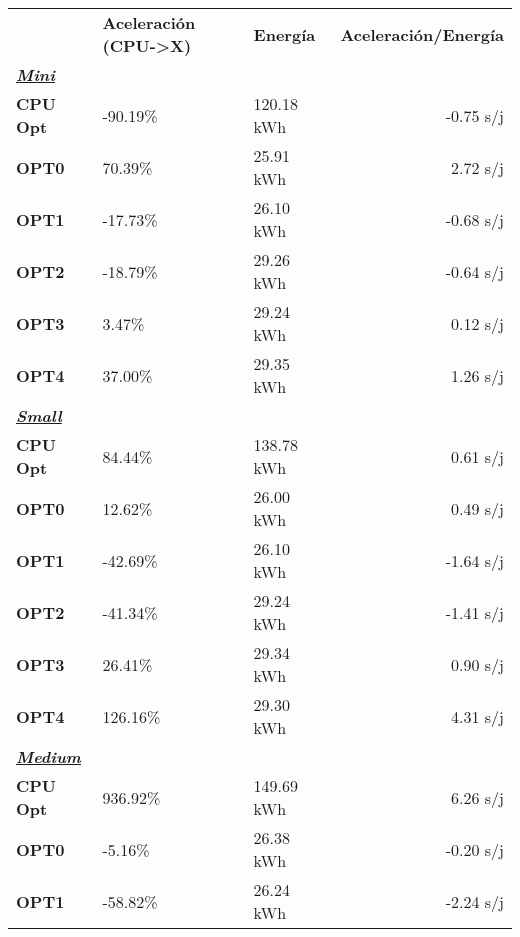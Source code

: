 \begin{table}[H]
    \centering
    \begin{tabular}{lllr}
    \rowcolor[HTML]{DAE8FC} \ & \textbf{Aceleración (CPU->X)} & \textbf{	Energía} & \textbf{	Aceleración/Energía} \\
    \cellcolor[HTML]{DAE8FC} \textbf{\textbf{{\emph{{\underline{{Mini}}}}}}} & &	&	 \\
    \rowcolor[HTML]{EFEFEF} \cellcolor[HTML]{DAE8FC} \textbf{CPU Opt} &-90.19\%  &	120.18 kWh  &	-0.75 s/j \\
    \cellcolor[HTML]{DAE8FC} \textbf{OPT0} & 70.39\%  &	25.91 kWh  &	2.72 s/j \\
    \rowcolor[HTML]{EFEFEF} \cellcolor[HTML]{DAE8FC} \textbf{OPT1} &-17.73\%  &	26.10 kWh  &	-0.68 s/j \\
    \cellcolor[HTML]{DAE8FC} \textbf{OPT2} & -18.79\%  &	29.26 kWh  &	-0.64 s/j \\
    \rowcolor[HTML]{EFEFEF} \cellcolor[HTML]{DAE8FC} \textbf{OPT3} &3.47\%  &	29.24 kWh  &	0.12 s/j \\
    \cellcolor[HTML]{DAE8FC} \textbf{OPT4} & 37.00\%  &	29.35 kWh  &	1.26 s/j \\
    \rowcolor[HTML]{EFEFEF} \cellcolor[HTML]{DAE8FC} \textbf{\textbf{{\emph{{\underline{{Small}}}}}}} &&	&	 \\
    \cellcolor[HTML]{DAE8FC} \textbf{CPU Opt} & 84.44\%  &	138.78 kWh  &	0.61 s/j \\
    \rowcolor[HTML]{EFEFEF} \cellcolor[HTML]{DAE8FC} \textbf{OPT0} &12.62\%  &	26.00 kWh  &	0.49 s/j \\
    \cellcolor[HTML]{DAE8FC} \textbf{OPT1} & -42.69\%  &	26.10 kWh  &	-1.64 s/j \\
    \rowcolor[HTML]{EFEFEF} \cellcolor[HTML]{DAE8FC} \textbf{OPT2} &-41.34\%  &	29.24 kWh  &	-1.41 s/j \\
    \cellcolor[HTML]{DAE8FC} \textbf{OPT3} & 26.41\%  &	29.34 kWh  &	0.90 s/j \\
    \rowcolor[HTML]{EFEFEF} \cellcolor[HTML]{DAE8FC} \textbf{OPT4} &126.16\%  &	29.30 kWh  &	4.31 s/j \\
    \cellcolor[HTML]{DAE8FC} \textbf{\textbf{{\emph{{\underline{{Medium}}}}}}} & &	&	 \\
    \rowcolor[HTML]{EFEFEF} \cellcolor[HTML]{DAE8FC} \textbf{CPU Opt} &936.92\%  &	149.69 kWh  &	6.26 s/j \\
    \cellcolor[HTML]{DAE8FC} \textbf{OPT0} & -5.16\%  &	26.38 kWh  &	-0.20 s/j \\
    \rowcolor[HTML]{EFEFEF} \cellcolor[HTML]{DAE8FC} \textbf{OPT1} &-58.82\%  &	26.24 kWh  &	-2.24 s/j \\

\end{tabular}
\end{table}
